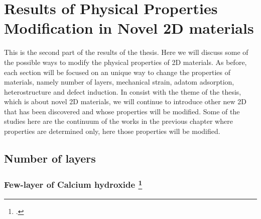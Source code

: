 
\chapter{Results of Physical Properties Modification in Novel 2D materials \label{chap:5}}

\ifpdf
    \graphicspath{{Chapter5/Figs/Raster/}{Chapter5/Figs/PDF/}{Chapter5/Figs/}{Chapter5/Figs/Vector/}}
\else
    \graphicspath{{Chapter5/Figs/Vector/}{Chapter5/Figs/}}
\fi

This is the second part of the results of the thesis. Here we will discuss some of the possible ways to modify the physical properties of 2D materials. As before, each section will be focused on an unique way to change the properties of materials, namely number of layers, mechanical strain, adatom adsorption, heterostructure and defect induction. In consist with the theme of the thesis, which is about novel 2D materials, we will continue to introduce other new 2D that has been discovered and whose properties will be modified. Some of the studies here are the continuum of the works in the previous chapter where properties are determined only, here those properties will be modified. 


\section{Number of layers}
\subsection[Few-layer of Calcium hydroxide]{Few-layer of Calcium hydroxide \footcite[This work is published in:][]{Aierken2015.porlandite}}

